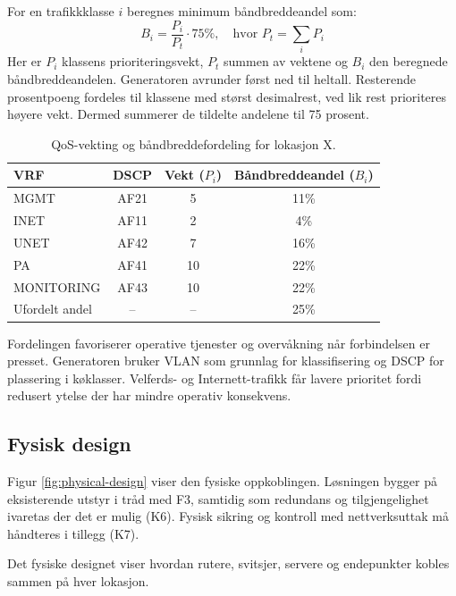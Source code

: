 For en trafikkklasse $i$ beregnes minimum båndbreddeandel som:
\[
    B_i =
    \frac{P_i}{P_t}
    \cdot 75\%, \quad \text{hvor } P_t = \sum_i P_i
\]
Her er $P_i$ klassens prioriteringsvekt, $P_t$ summen av vektene og $B_i$ den beregnede båndbreddeandelen. Generatoren avrunder først ned til heltall. Resterende prosentpoeng fordeles til klassene med størst desimalrest, ved lik rest prioriteres høyere vekt. Dermed summerer de tildelte andelene til 75 prosent.
\begin{table}[H]
    \centering
    \caption{QoS-vekting og båndbreddefordeling for lokasjon X.}
    \label{tab:qos-site-x}
    \small
    \renewcommand{\arraystretch}{1.3}
    \setlength{\tabcolsep}{7pt}
    \begin{tabular}{lccc}
        \toprule
        \rowcolor{tablegreen}
        \color{white}\textbf{VRF} &
        \color{white}\textbf{DSCP} &
        \color{white}\textbf{Vekt ($P_i$)} &
        \color{white}\textbf{Båndbreddeandel ($B_i$)} \\
        \midrule
        MGMT          & AF21 & 5  & 11\% \\
        INET          & AF11 & 2  & 4\%  \\
        UNET          & AF42 & 7  & 16\% \\
        PA            & AF41 & 10 & 22\% \\
        MONITORING    & AF43 & 10 & 22\% \\
        Ufordelt andel & --   & -- & 25\% \\
        \bottomrule
    \end{tabular}
\end{table}
\noindent
Fordelingen favoriserer operative tjenester og overvåkning når forbindelsen er presset. Generatoren bruker VLAN som grunnlag for klassifisering og DSCP for plassering i køklasser. Velferds- og Internett-trafikk får lavere prioritet fordi redusert ytelse der har mindre operativ konsekvens.

\subsection{Fysisk design}
Figur \ref{fig:physical-design} viser den fysiske oppkoblingen. Løsningen bygger på eksisterende utstyr i tråd med F3, samtidig som redundans og tilgjengelighet ivaretas der det er mulig (K6). Fysisk sikring og kontroll med nettverksuttak må håndteres i tillegg (K7).

Det fysiske designet viser hvordan rutere, svitsjer, servere og endepunkter kobles sammen på hver lokasjon.

